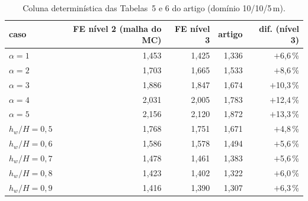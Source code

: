 \documentclass[11pt,a4paper]{article}
\begin{document}
\begin{table}[H]\centering\small\caption{Coluna determinística das Tabelas~5 e 6 do artigo (domínio 10/10/5\,m).}\label{tab:t56}\begin{tabular}{lrrrr}\toprule caso & FE nível 2 (malha do MC) & FE nível 3 & artigo & dif. (nível 3)\\\midrule
$\alpha = 1$ & 1{,}453 & 1{,}425 & 1{,}336 & $+$6{,}6\,\%\\
$\alpha = 2$ & 1{,}703 & 1{,}665 & 1{,}533 & $+$8{,}6\,\%\\
$\alpha = 3$ & 1{,}886 & 1{,}847 & 1{,}674 & $+$10{,}3\,\%\\
$\alpha = 4$ & 2{,}031 & 2{,}005 & 1{,}783 & $+$12{,}4\,\%\\
$\alpha = 5$ & 2{,}156 & 2{,}120 & 1{,}872 & $+$13{,}3\,\%\\
$h_w/H = 0{,}5$ & 1{,}768 & 1{,}751 & 1{,}671 & $+$4{,}8\,\%\\
$h_w/H = 0{,}6$ & 1{,}586 & 1{,}578 & 1{,}494 & $+$5{,}6\,\%\\
$h_w/H = 0{,}7$ & 1{,}478 & 1{,}461 & 1{,}383 & $+$5{,}6\,\%\\
$h_w/H = 0{,}8$ & 1{,}423 & 1{,}402 & 1{,}322 & $+$6{,}0\,\%\\
$h_w/H = 0{,}9$ & 1{,}416 & 1{,}390 & 1{,}307 & $+$6{,}3\,\%\\
\bottomrule\end{tabular}\end{table}
\end{document}
